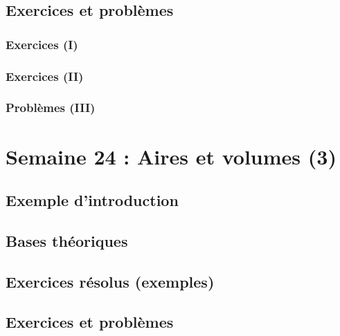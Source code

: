 \documentclass[
  12pt,
]{book}
\begin{document}
\hypertarget{exercices-et-probluxe8mes-22}{%
\section{Exercices et problèmes}\label{exercices-et-probluxe8mes-22}}

\hypertarget{exercices-i-22}{%
\subsection{Exercices (I)}\label{exercices-i-22}}

\hypertarget{exercices-ii-22}{%
\subsection{Exercices (II)}\label{exercices-ii-22}}

\hypertarget{probluxe8mes-iii-22}{%
\subsection{Problèmes (III)}\label{probluxe8mes-iii-22}}

\hypertarget{semaine-24-aires-et-volumes-3}{%
\chapter{Semaine 24 : Aires et volumes (3)}\label{semaine-24-aires-et-volumes-3}}

\hypertarget{exemple-dintroduction-23}{%
\section{Exemple d'introduction}\label{exemple-dintroduction-23}}

\hypertarget{bases-thuxe9oriques-23}{%
\section{Bases théoriques}\label{bases-thuxe9oriques-23}}

\hypertarget{exercices-ruxe9solus-exemples-23}{%
\section{Exercices résolus (exemples)}\label{exercices-ruxe9solus-exemples-23}}

\hypertarget{exercices-et-probluxe8mes-23}{%
\section{Exercices et problèmes}\label{exercices-et-probluxe8mes-23}}
\end{document}
